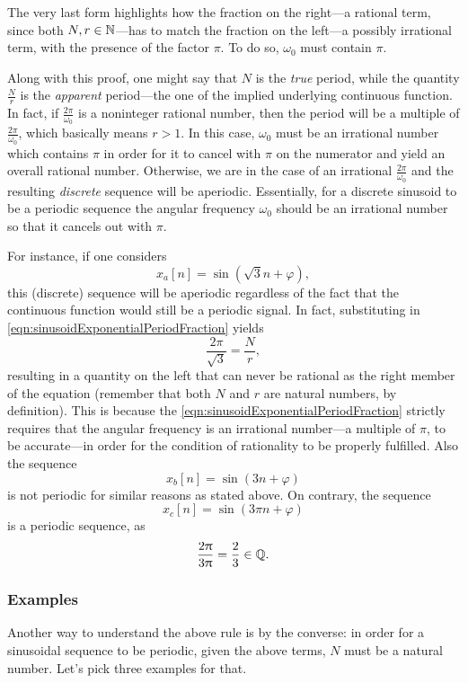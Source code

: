 \documentclass[\documentfontsize, twocolumn]{\classname}
\begin{document}
The very last form highlights how the fraction on the right---a rational term, since both $N,r \in \mathbb N$---has to match the fraction on the left---a possibly irrational term, with the presence of the factor $\pi$. To do so, $\omega_0$ must contain $\pi$.

Along with this proof, one might say that $N$ is the \emph{true} period, while the quantity $\frac{N}{r}$ is the \emph{apparent} period---the one of the implied underlying continuous function.
In fact, if $\frac{2\pi}{\omega_0}$ is a noninteger rational number, then the period will be a multiple of $\frac{2\pi}{\omega_0}$, which basically means $r > 1$.
In this case, $\omega_0$ must be an irrational number which contains $\pi$ in order for it to cancel with $\pi$ on the numerator and yield an overall rational number.
Otherwise, we are in the case of an irrational $\frac{2\pi}{\omega_0}$ and the resulting \emph{discrete} se\-quen\-ce will be aperiodic.
Essentially, for a discrete sinusoid to be a periodic sequence the angular frequency $\omega_0$ should be an irrational number so that it cancels out with $\pi$.

For instance, if one considers \[x_a[n] = \sin{(\sqrt{3}n + \varphi)},\] this (discrete) se\-quen\-ce will be aperiodic regardless of the fact that the continuous function would still be a periodic signal. In fact, substituting in \ref{eqn:sinusoidExponentialPeriodFraction} yields \[\frac{2\pi}{\sqrt{3}} = \frac N r,\] resulting in a quantity on the left that can never be rational as the right member of the equation (remember that both $N$ and $r$ are natural numbers, by definition). This is because the \ref{eqn:sinusoidExponentialPeriodFraction} strictly requires that the angular frequency is an irrational number---a multiple of $\pi$, to be accurate---in order for the condition of rationality to be properly fulfilled. Also the sequence \[x_b[n] = \sin{(3n + \varphi)}\] is not periodic for similar reasons as stated above. On contrary, the sequence \[x_c[n] = \sin{(3\pi n + \varphi)}\] is a periodic sequence, as \[\frac{2\uppi}{3\uppi} = \frac 2 3 \in \mathbb Q.\]

\subsubsection{Examples}

Another way to understand the above rule is by the converse: in order for a sinusoidal sequence to be periodic, given the above terms, $N$ must be a natural number. Let's pick three examples for that.
\end{document}
